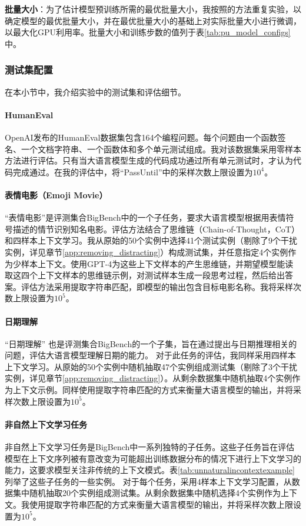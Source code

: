 \textbf{批量大小}：为了估计模型预训练所需的最优批量大小，我按照\citet{kaplan2020scaling}的方法重复实验，以确定模型的最优批量大小，并在最优批量大小的基础上对实际批量大小进行微调，以最大化GPU利用率。批量大小和训练步数的值列于表\ref{tab:pu_model_configs}中。 

\subsubsection{测试集配置}
\label{app:testset}
在本小节中，我介绍实验中的测试集和评估细节。
\paragraph{HumanEval}
\label{app:humaneval}
OpenAI发布的HumanEval\citep{chen2021evaluating}数据集包含164个编程问题。每个问题由一个函数签名、一个文档字符串、一个函数体和多个单元测试组成。我对该数据集采用零样本方法进行评估。只有当大语言模型生成的代码成功通过所有单元测试时，才认为代码完成通过。在我的评估中，将“PassUntil”中的采样次数上限设置为\(10^4\)。

\paragraph{表情电影（Emoji Movie）}
\label{app:emoji_movies}
“表情电影”是评测集合BigBench\citep{srivastava2022beyond}中的一个子任务，要求大语言模型根据用表情符号描述的情节识别知名电影。评估方法结合了思维链（Chain-of-Thought，CoT）和四样本上下文学习。我从原始的50个实例中选择41个测试实例（剔除了9个干扰实例，详见章节\ref{app:removing_distracting}）构成测试集，并任意指定4个实例作为少样本上下文。使用GPT-4为这些上下文样本的产生思维链，并期望模型能读取这四个上下文样本的思维链示例，对测试样本生成一段思考过程，然后给出答案。评估方法采用提取字符串匹配，即模型的输出包含目标电影名称。我将采样次数上限设置为\(10^5\)。 

\paragraph{日期理解}
\label{app:dateunderstanding}
“日期理解” 也是评测集合BigBench\citep{srivastava2022beyond}的一个子集，旨在通过提出与日期推理相关的问题，评估大语言模型理解日期的能力。
对于此任务的评估，我同样采用四样本上下文学习。从原始的50个实例中随机抽取47个实例组成测试集（剔除了3个干扰实例，详见章节\ref{app:removing_distracting}）。从剩余数据集中随机抽取4个实例作为上下文示例。同样使用提取字符串匹配的方式来衡量大语言模型的输出，并将采样次数上限设置为\(10^5\)。

\paragraph{非自然上下文学习任务}
\label{app:unantural_in_context_learning}
非自然上下文学习任务是BigBench\citep{srivastava2022beyond}中一系列独特的子任务。这些子任务旨在评估模型在上下文序列被有意改变为可能超出训练数据分布的情况下进行上下文学习的能力，这要求模型关注非传统的上下文模式。表\ref{tab:unnaturalincontextexample}列举了这些子任务的一些实例。
对于每个任务，采用4样本上下文学习配置，从数据集中随机抽取20个实例组成测试集。从剩余数据集中随机选择4个实例作为上下文。我使用提取字符串匹配的方式来衡量大语言模型的输出，并将采样次数上限设置为\(10^5\)。


